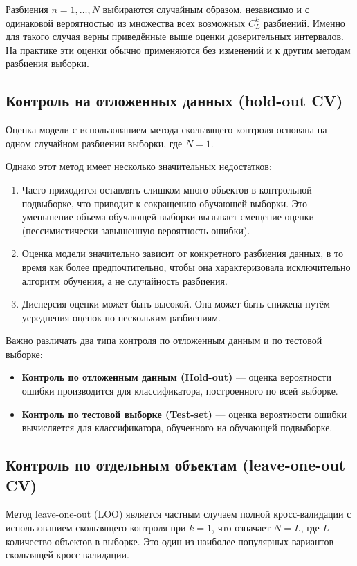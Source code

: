 Разбиения $n = 1, \ldots, N$ выбираются случайным образом, независимо и с одинаковой вероятностью из множества всех возможных $C_L^k$ разбиений. Именно для такого случая верны приведённые выше оценки доверительных интервалов. На практике эти оценки обычно применяются без изменений и к другим методам разбиения выборки.

\subsection{Контроль на отложенных данных (hold-out CV)}
Оценка модели с использованием метода скользящего контроля основана на одном случайном разбиении выборки, где $N=1$.

Однако этот метод имеет несколько значительных недостатков:

\begin{enumerate}
    \item Часто приходится оставлять слишком много объектов в контрольной подвыборке, что приводит к сокращению обучающей выборки. Это уменьшение объема обучающей выборки вызывает смещение оценки (пессимистически завышенную вероятность ошибки).
    \item Оценка модели значительно зависит от конкретного разбиения данных, в то время как более предпочтительно, чтобы она характеризовала исключительно алгоритм обучения, а не случайность разбиения.
    \item Дисперсия оценки может быть высокой. Она может быть снижена путём усреднения оценок по нескольким разбиениям.
\end{enumerate}

Важно различать два типа контроля по отложенным данным и по тестовой выборке:

\begin{itemize}
    \item \textbf{Контроль по отложенным данным (Hold-out)} — оценка вероятности ошибки производится для классификатора, построенного по всей выборке.
    \item \textbf{Контроль по тестовой выборке (Test-set)} — оценка вероятности ошибки вычисляется для классификатора, обученного на обучающей подвыборке.
\end{itemize}

\subsection{Контроль по отдельным объектам (leave-one-out CV)}

Метод leave-one-out (LOO) является частным случаем полной кросс-валидации с использованием скользящего контроля при \( k = 1 \), что означает \( N = L \), где \( L \) — количество объектов в выборке. Это один из наиболее популярных вариантов скользящей кросс-валидации.

